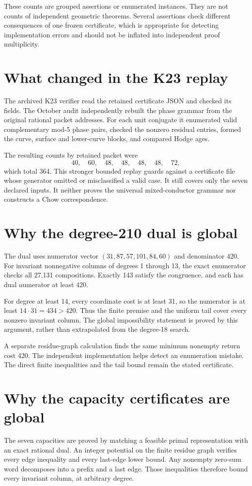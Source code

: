 These counts are grouped assertions or enumerated instances. They are not counts of independent geometric theorems. Several assertions check different consequences of one frozen certificate, which is appropriate for detecting implementation errors and should not be inflated into independent proof multiplicity.

\section{What changed in the K23 replay}
The archived K23 verifier read the retained certificate JSON and checked its fields. The October audit independently rebuilt the phase grammar from the original rational packet addresses. For each unit conjugate it enumerated valid complementary mod-5 phase pairs, checked the nonzero residual entries, formed the curve, surface and lower-curve blocks, and compared Hodge ages.

The resulting counts by retained packet were
\[
40,\quad60,\quad48,\quad48,\quad48,\quad48,\quad72,
\]
which total 364. This stronger bounded replay guards against a certificate file whose generator omitted or misclassified a valid case. It still covers only the seven declared inputs. It neither proves the universal mixed-conductor grammar nor constructs a Chow correspondence.

\section{Why the degree-210 dual is global}
The dual uses numerator vector $(31,87,57,101,84,60)$ and denominator 420. For invariant nonnegative columns of degrees 1 through 13, the exact enumerator checks all 27,131 compositions. Exactly 143 satisfy the congruence, and each has dual numerator at least 420.

For degree at least 14, every coordinate cost is at least 31, so the numerator is at least $14\cdot31=434>420$. Thus the finite premise and the uniform tail cover every nonzero invariant column. The global impossibility statement is proved by this argument, rather than extrapolated from the degree-18 search.

A separate residue-graph calculation finds the same minimum nonempty return cost 420. The independent implementation helps detect an enumeration mistake. The direct finite inequalities and the tail bound remain the stated certificate.

\section{Why the capacity certificates are global}
The seven capacities are proved by matching a feasible primal representation with an exact rational dual. An integer potential on the finite residue graph verifies every edge inequality and every last-edge lower bound. Any nonempty zero-sum word decomposes into a prefix and a last edge. Those inequalities therefore bound every invariant column, at arbitrary degree.

